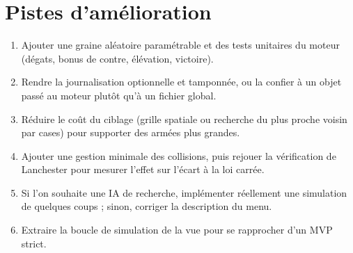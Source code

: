\documentclass[11pt,a4paper]{article}
\begin{document}
\section{Pistes d'am\'elioration}

\begin{enumerate}
  \item Ajouter une graine al\'eatoire param\'etrable et des tests unitaires du moteur (d\'egats, bonus de contre, \'el\'evation, victoire).
  \item Rendre la journalisation optionnelle et tamponn\'ee, ou la confier \`a un objet pass\'e au moteur plut\^ot qu'\`a un fichier global.
  \item R\'eduire le co\^ut du ciblage (grille spatiale ou recherche du plus proche voisin par cases) pour supporter des arm\'ees plus grandes.
  \item Ajouter une gestion minimale des collisions, puis rejouer la v\'erification de Lanchester pour mesurer l'effet sur l'\'ecart \`a la loi carr\'ee.
  \item Si l'on souhaite une IA de recherche, impl\'ementer r\'eellement une simulation de quelques coups ; sinon, corriger la description du menu.
  \item Extraire la boucle de simulation de la vue pour se rapprocher d'un MVP strict.
\end{enumerate}
\end{document}
